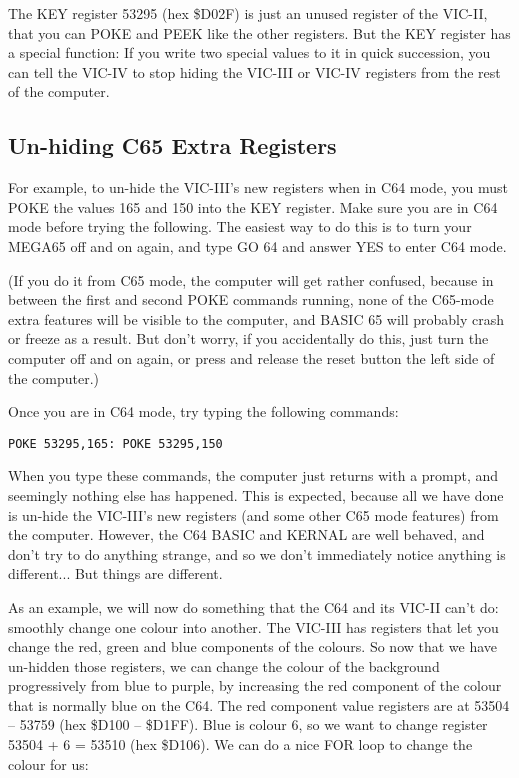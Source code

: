 The KEY register 53295 (hex \$D02F) is just an unused register of the VIC-II, that you can POKE and
PEEK like the other registers.  But the KEY register has a special function: If
you write two special values to it in quick succession, you can tell the VIC-IV
to stop hiding the VIC-III or VIC-IV registers from the rest of the computer.

\subsection{Un-hiding C65 Extra Registers}

For example, to un-hide the VIC-III's new registers when in C64 mode, you must POKE the values 165 and 150
into the KEY register. Make sure you are in C64 mode before trying the following.  The easiest way to do this
is to turn your MEGA65 off and on again, and type GO 64 and answer YES to enter C64 mode.

(If you do it from
C65 mode, the computer will get rather confused, because in between the first and second POKE commands running,
none of the C65-mode extra features will be visible to the computer, and BASIC 65 will probably crash or
freeze as a result. But don't worry, if you accidentally do this, just turn the computer off and on again,
or press and release the reset button the left side of the computer.)

Once you are in C64 mode, try typing the following commands:

\begin{tcolorbox}[colback=black,coltext=white]
\verbatimfont{\codefont}
\begin{verbatim}
POKE 53295,165: POKE 53295,150
\end{verbatim}
\end{tcolorbox}

When you type these commands, the computer just returns with a  prompt, and seemingly nothing else has
happened.  This is expected, because all we have done is un-hide the VIC-III's new registers (and some other
C65 mode features) from the computer.  However, the C64 BASIC and KERNAL are well behaved, and don't try to
do anything strange, and so we don't immediately notice anything is different... But things are different.

As an example, we will now do something that the C64 and its VIC-II can't do: smoothly change one colour into another.
The VIC-III has registers that let you change the red, green and blue components of the colours.  So now that we have
un-hidden those registers, we can change the colour of the background progressively from blue to purple, by increasing
the red component of the colour that is normally blue on the C64.  The red component value registers are at
53504 -- 53759 (hex \$D100 -- \$D1FF).  Blue is colour 6, so we want to change register 53504 + 6 = 53510 (hex \$D106).
We can do a nice FOR loop to change the colour for us:

